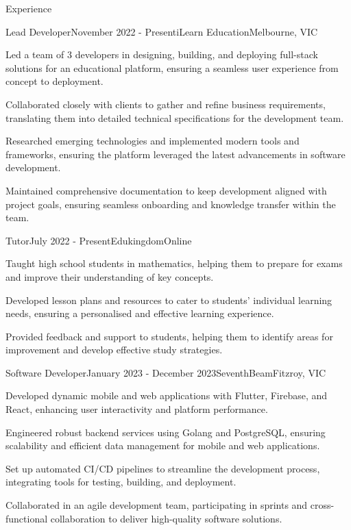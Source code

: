 \documentclass[
	11pt, %
]{resume} %
\begin{document}
\begin{rSection}{Experience}

	\begin{rSubsection}{Lead Developer}{November 2022 - Present}{iLearn Education}{Melbourne, VIC}
		\item Led a team of 3 developers in designing, building, and deploying full-stack solutions for an educational platform, ensuring a seamless user experience from concept to deployment.
		\item Collaborated closely with clients to gather and refine business requirements, translating them into detailed technical specifications for the development team.
		\item Researched emerging technologies and implemented modern tools and frameworks, ensuring the platform leveraged the latest advancements in software development.
		\item Maintained comprehensive documentation to keep development aligned with project goals, ensuring seamless onboarding and knowledge transfer within the team.
	\end{rSubsection}


	\begin{rSubsection}{Tutor}{July 2022 - Present}{Edukingdom}{Online}
		\item Taught high school students in mathematics, helping them to prepare for exams and improve their understanding of key concepts.
		\item Developed lesson plans and resources to cater to students' individual learning needs, ensuring a personalised and effective learning experience.
		\item Provided feedback and support to students, helping them to identify areas for improvement and develop effective study strategies.
	\end{rSubsection}


	\begin{rSubsection}{Software Developer}{January 2023 - December 2023}{SeventhBeam}{Fitzroy, VIC}
		\item Developed dynamic mobile and web applications with Flutter, Firebase, and React, enhancing user interactivity and platform performance.
		\item Engineered robust backend services using Golang and PostgreSQL, ensuring scalability and efficient data management for mobile and web applications.
		\item Set up automated CI/CD pipelines to streamline the development process, integrating tools for testing, building, and deployment.
		\item Collaborated in an agile development team, participating in sprints and cross-functional collaboration to deliver high-quality software solutions.
	\end{rSubsection}


\end{rSection}
\end{document}
